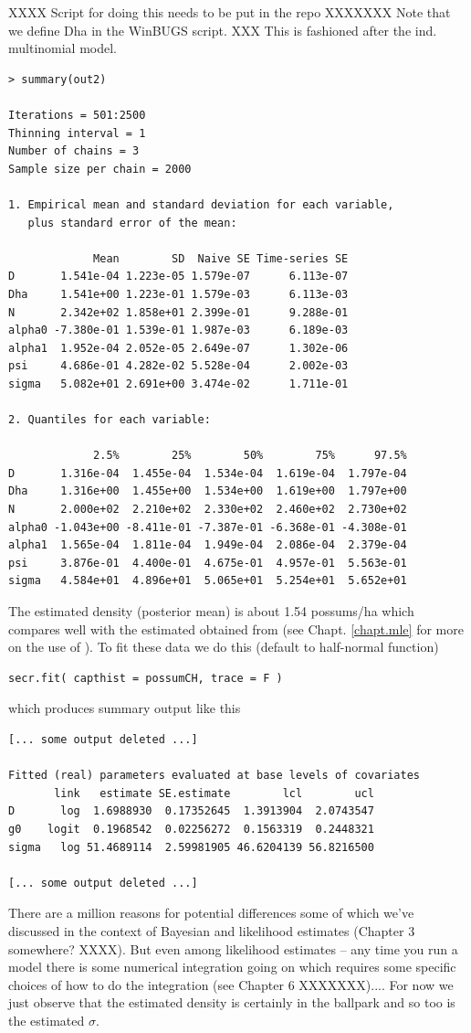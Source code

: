 XXXX Script for doing this needs to be put in the repo XXXXXXX
Note that we define Dha in the WinBUGS script.
XXX This is fashioned after the ind. multinomial model.

{\small 
\begin{verbatim}
> summary(out2)

Iterations = 501:2500
Thinning interval = 1 
Number of chains = 3 
Sample size per chain = 2000 

1. Empirical mean and standard deviation for each variable,
   plus standard error of the mean:

             Mean        SD  Naive SE Time-series SE
D       1.541e-04 1.223e-05 1.579e-07      6.113e-07
Dha     1.541e+00 1.223e-01 1.579e-03      6.113e-03
N       2.342e+02 1.858e+01 2.399e-01      9.288e-01
alpha0 -7.380e-01 1.539e-01 1.987e-03      6.189e-03
alpha1  1.952e-04 2.052e-05 2.649e-07      1.302e-06
psi     4.686e-01 4.282e-02 5.528e-04      2.002e-03
sigma   5.082e+01 2.691e+00 3.474e-02      1.711e-01

2. Quantiles for each variable:

             2.5%        25%        50%        75%      97.5%
D       1.316e-04  1.455e-04  1.534e-04  1.619e-04  1.797e-04
Dha     1.316e+00  1.455e+00  1.534e+00  1.619e+00  1.797e+00
N       2.000e+02  2.210e+02  2.330e+02  2.460e+02  2.730e+02
alpha0 -1.043e+00 -8.411e-01 -7.387e-01 -6.368e-01 -4.308e-01
alpha1  1.565e-04  1.811e-04  1.949e-04  2.086e-04  2.379e-04
psi     3.876e-01  4.400e-01  4.675e-01  4.957e-01  5.563e-01
sigma   4.584e+01  4.896e+01  5.065e+01  5.254e+01  5.652e+01
\end{verbatim}
}

The estimated density (posterior mean) is about 1.54 possums/ha which
compares well with the estimated obtained from \secr (see
Chapt. \ref{chapt.mle} for more on the use of \secr).
To fit these data we do this (default to half-normal function)
\begin{verbatim}
secr.fit( capthist = possumCH, trace = F )
\end{verbatim}
which produces summary output like this
\begin{verbatim}
[... some output deleted ...]

Fitted (real) parameters evaluated at base levels of covariates 
       link   estimate SE.estimate        lcl        ucl
D       log  1.6988930  0.17352645  1.3913904  2.0743547
g0    logit  0.1968542  0.02256272  0.1563319  0.2448321
sigma   log 51.4689114  2.59981905 46.6204139 56.8216500

[... some output deleted ...]
\end{verbatim}
There are a million reasons for potential differences some of which
we've discussed in the context of Bayesian and likelihood estimates
(Chapter 3 somewhere? XXXX).
But even among likelihood estimates -- any time you run a model there
is some numerical integration going on which requires some specific
choices of how to do the integration (see Chapter 6 XXXXXXX)....
For now we just observe that the estimated density is certainly in the
ballpark and so too is the estimated $\sigma$.



